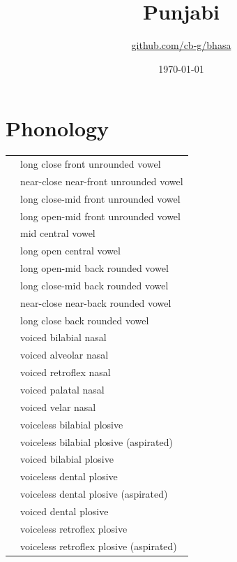 \documentclass{article}
\title{Punjabi\\\ipa{[p@\textltailn"\t{\textdyoghlig}a\u{b}.bi]}}
\author{\href{https://github.com/cb-g/bhasa}{github.com/cb-g/bhasa}}
\date{\today}
\begin{document}
\pagecolor{custom_bg}\color{custom_fg}
\maketitle\thispagestyle{empty}

\newpage\setcounter{page}{1}\section{Phonology}

\begin{xltabular}{\textwidth}{lL}
   & long close front unrounded vowel \\
   & near-close near-front unrounded vowel \\
   & long close-mid front unrounded vowel \\
   & long open-mid front unrounded vowel \\
   & mid central vowel \\
   & long open central vowel \\
   & long open-mid back rounded vowel \\
   & long close-mid back rounded vowel \\
   & near-close near-back rounded vowel \\
   & long close back rounded vowel \\
   & voiced bilabial nasal \\
   & voiced alveolar nasal \\
   & voiced retroflex nasal \\
   & voiced palatal nasal \\
   & voiced velar nasal \\
   & voiceless bilabial plosive \\
   & voiceless bilabial plosive (aspirated) \\
   & voiced bilabial plosive \\
   & voiceless dental plosive \\
   & voiceless dental plosive (aspirated) \\
   & voiced dental plosive \\
   & voiceless retroflex plosive \\
   & voiceless retroflex plosive (aspirated) \\

\end{xltabular}
\end{document}
